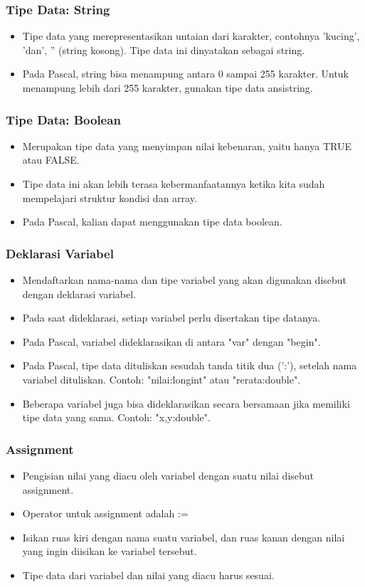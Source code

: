 \documentclass{beamer}
\begin{document}
\begin{frame}
\frametitle{Tipe Data: String}
\begin{itemize}
	\item Tipe data yang merepresentasikan untaian dari karakter, contohnya 'kucing', 'dan', '' (string kosong). Tipe data ini dinyatakan sebagai \alert{string}.
	\item Pada Pascal, string bisa menampung antara 0 sampai 255 karakter. Untuk menampung lebih dari 255 karakter, gunakan tipe data \alert{ansistring}.
\end{itemize}
\end{frame}

\begin{frame}
\frametitle{Tipe Data: Boolean}
\begin{itemize}
	\item Merupakan tipe data yang menyimpan nilai kebenaran, yaitu hanya TRUE atau FALSE.
	\item Tipe data ini akan lebih terasa kebermanfaatannya ketika kita sudah mempelajari struktur kondisi dan array.
	\item Pada Pascal, kalian dapat menggunakan tipe data \alert{boolean}.
\end{itemize}
\end{frame}


\begin{frame}
\frametitle{Deklarasi Variabel}
\begin{itemize}
	\item Mendaftarkan nama-nama dan tipe variabel yang akan digunakan disebut dengan deklarasi variabel.
	\item Pada saat dideklarasi, setiap variabel perlu disertakan tipe datanya. 
	\item Pada Pascal, variabel dideklarasikan di antara "var" dengan "begin".
	\item Pada Pascal, tipe data dituliskan sesudah tanda titik dua (':'), setelah nama variabel dituliskan. Contoh: "nilai:longint" atau "rerata:double".
	\item Beberapa variabel juga bisa dideklarasikan secara bersamaan jika memiliki tipe data yang sama. Contoh: "x,y:double".
\end{itemize}
\end{frame}

\begin{frame}
\frametitle{Assignment}
\begin{itemize}
	\item Pengisian nilai yang diacu oleh variabel dengan suatu nilai disebut \alert{assignment}.
	\item Operator untuk assignment adalah :=
	\item Isikan ruas kiri dengan nama suatu variabel, dan ruas kanan dengan nilai yang ingin diisikan ke variabel tersebut.
	\item Tipe data dari variabel dan nilai yang diacu \alert{harus sesuai}.
\end{itemize}
\end{frame}
\end{document}
